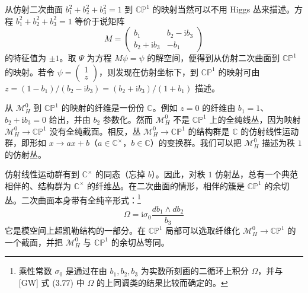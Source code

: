 
从仿射二次曲面 $b_1^2+b_2^2+b_3^2=1$ 到 $\mathbb{C}\mathbb{P}^1$ 的映射当然可以不用 Higgs 丛来描述。方程 $b_1^2+b_2^2+b_3^2=1$ 等价于说矩阵
\begin{equation}\tag{3.41}
M=
\begin{pmatrix}
b_1 & b_2-\mathrm{i}b_3\\
b_2+\mathrm{i}b_3 & -b_1
\end{pmatrix}
\end{equation}
的特征值为 $\pm1$。取 $\Psi$ 为方程 $M\psi=\psi$ 的解空间，便得到从仿射二次曲面到 $\mathbb{C}\mathbb{P}^1$ 的映射。若令 $\psi=\begin{pmatrix}1\\ z\end{pmatrix}$，则发现在仿射坐标下，到 $\mathbb{C}\mathbb{P}^1$ 的映射可由 $z=(1-b_1)/(b_2-\mathrm{i}b_3)=(b_2+\mathrm{i}b_3)/(1+b_1)$ 描述。

从 $\mathcal{M}_H^0$ 到 $\mathbb{C}\mathbb{P}^1$ 的映射的纤维是一份份 $\mathbb{C}$。例如 $z=0$ 的纤维由 $b_1=1$、$b_2+\mathrm{i}b_3=0$ 给出，并由 $b_2$ 参数化。然而 $\mathcal{M}_H^0$ 不是 $\mathbb{C}\mathbb{P}^1$ 上的全纯线丛，因为映射 $\mathcal{M}_H^0\to\mathbb{C}\mathbb{P}^1$ 没有全纯截面。相反，丛 $\mathcal{M}_H^0\to\mathbb{C}\mathbb{P}^1$ 的结构群是 $\mathbb{C}$ 的仿射线性运动群，即形如 $x\to ax+b$（$a\in\mathbb{C}^\times$，$b\in\mathbb{C}$）的变换群。我们可以把 $\mathcal{M}_H^0$ 描述为秩 $1$ 的仿射丛。

仿射线性运动群有到 $\mathbb{C}^\times$ 的同态（忘掉 $b$）。因此，对秩 $1$ 仿射丛，总有一个典范相伴的、结构群为 $\mathbb{C}^\times$ 的纤维丛。在二次曲面的情形，相伴的簇是 $\mathbb{C}\mathbb{P}^1$ 的余切丛。二次曲面本身带有全纯辛形式：\footnote{乘性常数 $\sigma_0$ 是通过在由 $b_1,b_2,b_3$ 为实数所刻画的二循环上积分 $\Omega$，并与 [GW] 式 (3.77) 中 $\Omega$ 的上同调类的结果比较而确定的。}
\begin{equation}\tag{3.42}
\Omega=\mathrm{i}\sigma_0\frac{db_1\wedge db_2}{b_3}
\end{equation}
它是模空间上超凯勒结构的一部分。在 $\mathbb{C}\mathbb{P}^1$ 局部可以选取纤维化 $\mathcal{M}_H^0\to\mathbb{C}\mathbb{P}^1$ 的一个截面，并把 $\mathcal{M}_H^0$ 与 $\mathbb{C}\mathbb{P}^1$ 的余切丛等同。

